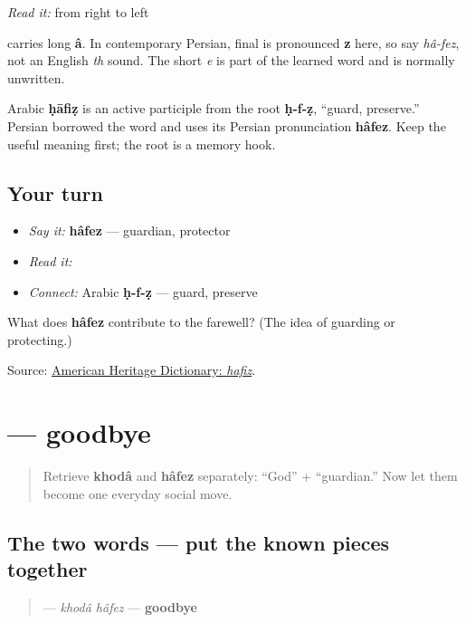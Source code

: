 \emph{Read it:} \textbf{   } from right to left

\textbf{} carries long \textbf{â}. In contemporary Persian, final \textbf{} is pronounced \textbf{z} here, so say \emph{hâ-fez}, not an English \emph{th} sound. The short \emph{e} is part of the learned word and is normally unwritten.

\begin{cousinweb}
Arabic \textbf{ḥāfiẓ} is an active participle from the root \textbf{ḥ-f-ẓ}, “guard, preserve.” Persian borrowed the word and uses its Persian pronunciation \textbf{hâfez}. Keep the useful meaning first; the root is a memory hook.
\end{cousinweb}

\subsection*{Your turn}
\begin{itemize}
\raggedright
  \item \emph{Say it:} \textbf{hâfez} — guardian, protector
  \item \emph{Read it:} \textbf{}
  \item \emph{Connect:} Arabic \textbf{ḥ-f-ẓ} — guard, preserve
\end{itemize}

\begin{tcolorbox}[breakable,colback=teal!4,colframe=teal!35!black,title={Before you move on}]
What does \textbf{hâfez} contribute to the farewell? (The idea of guarding or protecting.)

Source: \href{https://www.ahdictionary.com/word/search.html?q=hafiz}{American Heritage Dictionary: \emph{hafiz}}.
\end{tcolorbox}
\section[\texorpdfstring{\fa{خداحافظ} (khodâ hâfez)}{خداحافظ (khodâ hâfez)}]{ — goodbye}

\label{lesson:FA-C05-khodahafez}



\begin{quote}
Retrieve \textbf{khodâ} and \textbf{hâfez} separately: “God” + “guardian.” Now let them become one everyday social move.
\end{quote}

\subsection*{The two words — put the known pieces together}
\begin{quote}
\textbf{} — \emph{khodâ hâfez} — \textbf{goodbye}
\end{quote}

